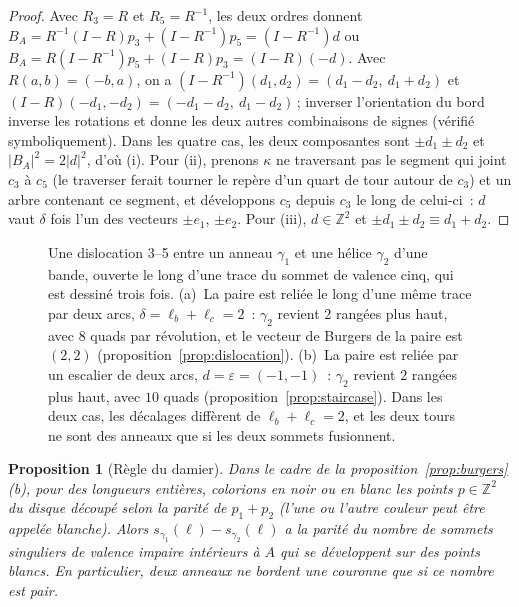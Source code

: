 \documentclass[11pt,a4paper]{article}
\newtheorem{proposition}{Proposition}
\newcommand{\Z}{\mathbb{Z}}
\newcommand{\shift}{s}
\newcommand{\lean}[1]{\texttt{\detokenize{#1}}}
\newenvironment{evidence}[3][]{}{}
\begin{document}
\begin{proof}
Avec $R_3 = R$ et $R_5 = R^{-1}$, les deux ordres donnent $B_A = R^{-1}(I -
R)p_3 + (I - R^{-1})p_5 = (I - R^{-1})d$ ou $B_A = R(I - R^{-1})p_5 + (I -
R)p_3 = (I - R)(-d)$. Avec $R(a, b) = (-b, a)$, on a $(I - R^{-1})(d_1, d_2) =
(d_1 - d_2,\ d_1 + d_2)$ et $(I - R)(-d_1, -d_2) = (-d_1 - d_2,\ d_1 -
d_2)$\,; inverser l'orientation du bord inverse les rotations et donne les
deux autres combinaisons de signes (vérifié symboliquement). Dans les quatre
cas, les deux composantes sont $\pm d_1 \pm d_2$ et $|B_A|^2 = 2|d|^2$, d'où
(i). Pour (ii), prenons $\kappa$ ne traversant pas le segment qui joint $c_3$
à $c_5$ (le traverser ferait tourner le repère d'un quart de tour autour de
$c_3$) et un arbre contenant ce segment, et développons $c_5$ depuis $c_3$ le
long de celui-ci~: $d$ vaut $\delta$ fois l'un des vecteurs $\pm e_1$, $\pm
e_2$. Pour (iii), $d \in \Z^2$ et $\pm d_1 \pm d_2 \equiv d_1 + d_2$.
\end{proof}

\begin{figure}[t]
\centering

\caption{Une dislocation 3--5 entre un anneau $\gamma_1$ et une hélice
$\gamma_2$ d'une bande, ouverte le long d'une trace du sommet de valence cinq,
qui est dessiné trois fois. (a)~La paire est reliée le long d'une même trace
par deux arcs, $\delta = \ell_b + \ell_c = 2$~: $\gamma_2$ revient $2$ rangées
plus haut, avec $8$ quads par révolution, et le vecteur de Burgers de la paire
est $(2, 2)$ (proposition~\ref{prop:dislocation}). (b)~La paire est reliée
par un escalier de deux arcs, $d = \varepsilon = (-1, -1)$~: $\gamma_2$
revient $2$ rangées plus haut, avec $10$ quads
(proposition~\ref{prop:staircase}). Dans les deux cas, les décalages
diffèrent de $\ell_b + \ell_c = 2$, et les deux tours ne sont des anneaux que
si les deux sommets fusionnent.}
\label{fig:dislocation}
\end{figure}

\begin{evidence}{core}{\lean{checkerboard}, \lean{oddColours_translate}\,; testé~: 1\,960 couronnes sur les sphères de 50 instances aléatoires\,; supposé~: la somme de Burgers de la proposition ci-dessus}
\begin{proposition}[Règle du damier]\label{prop:checkerboard}
Dans le cadre de la proposition~\ref{prop:burgers}(b), pour des longueurs
entières, colorions en noir ou en blanc les points $p \in \Z^2$ du disque
découpé selon la parité de $p_1 + p_2$ (l'une ou l'autre couleur peut être
appelée blanche). Alors $\shift_{\gamma_1}(\ell) - \shift_{\gamma_2}(\ell)$ a
la parité du nombre de sommets singuliers de valence impaire intérieurs à $A$
qui se développent sur des points blancs. En particulier, deux anneaux ne
bordent une couronne que si ce nombre est pair.
\end{proposition}
\end{evidence}
\end{document}
